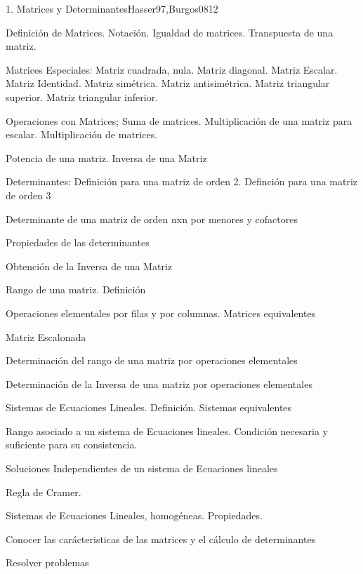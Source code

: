 \begin{syllabus}
\begin{unit}{1. Matrices y Determinantes}{Hasser97,Burgos08}{12}
\begin{topics}
      \item Definición de Matrices. Notación. Igualdad de matrices. Transpuesta de una matriz.
      \item Matrices Especiales: Matriz cuadrada, nula. Matriz diagonal. Matriz  Escalar. Matriz Identidad. Matriz simétrica. Matriz antisimétrica. Matriz  triangular superior. Matriz triangular inferior.
      \item Operaciones con Matrices; Suma de matrices. Multiplicación de una matriz para escalar. Multiplicación de matrices.
	\item Potencia de una matriz. Inversa de una Matriz
	\item Determinantes: Definición para una matriz de orden 2. Definción para una matriz de orden 3
	\item Determinante de una matriz de orden nxn por menores y cofactores
	\item Propiedades de las determinantes
	\item Obtención de la Inversa de una Matriz
	\item Rango de una matriz. Definición
	\item Operaciones elementales por filas y por columnas. Matrices equivalentes
	\item Matriz Escalonada
	\item Determinación del rango de una matriz por operaciones elementales
	\item Determinación de la Inversa de una matriz por operaciones elementales
	\item Sistemas de Ecuaciones Lineales. Definición. Sistemas equivalentes
	\item Rango asociado a un sistema de Ecuaciones lineales. Condición necesaria y suficiente para su consistencia.
	\item Soluciones Independientes de un sistema de Ecuaciones lineales
	\item Regla de Cramer.
	\item Sistemas de Ecuaciones Lineales, homogéneas. Propiedades.
   \end{topics}

   \begin{unitgoals}
      \item Conocer las carácteristicas de las matrices y el cálculo de determinantes
	\item Resolver problemas
   \end{unitgoals}
\end{unit}


\end{syllabus}

